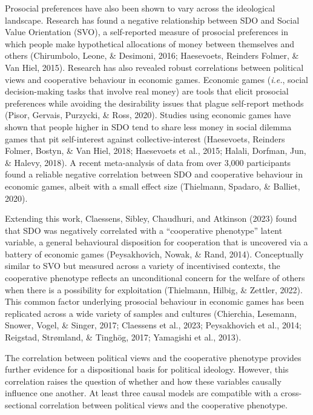 \documentclass[
  man,floatsintext]{apa6}
\begin{document}
Prosocial preferences have also been shown to vary across the ideological
landscape. Research has found a negative relationship between SDO and
Social Value Orientation (SVO), a self-reported measure of prosocial preferences
in which people make hypothetical allocations of money between themselves and
others (Chirumbolo, Leone, \& Desimoni, 2016; Haesevoets, Reinders Folmer, \& Van Hiel, 2015). Research has also revealed robust
correlations between political views and cooperative behaviour in economic
games. Economic games (\emph{i.e.}, social decision-making tasks that involve real
money) are tools that elicit prosocial preferences while avoiding the
desirability issues that plague self-report methods (Pisor, Gervais, Purzycki, \& Ross, 2020). Studies using
economic games have shown that people higher in SDO tend to share less money in
social dilemma games that pit self-interest against collective-interest
(Haesevoets, Reinders Folmer, Bostyn, \& Van Hiel, 2018; Haesevoets et al., 2015; Halali, Dorfman, Jun, \& Halevy, 2018). A recent meta-analysis of data
from over 3,000 participants found a reliable negative correlation between SDO
and cooperative behaviour in economic games, albeit with a small effect size
(Thielmann, Spadaro, \& Balliet, 2020).

Extending this work, Claessens, Sibley, Chaudhuri, and Atkinson (2023) found that SDO was negatively correlated
with a ``cooperative phenotype'' latent variable, a general behavioural
disposition for cooperation that is uncovered via a battery of economic games
(Peysakhovich, Nowak, \& Rand, 2014). Conceptually similar to SVO but measured across a variety
of incentivised contexts, the cooperative phenotype reflects an unconditional
concern for the welfare of others when there is a possibility for exploitation
(Thielmann, Hilbig, \& Zettler, 2022). This common factor underlying prosocial behaviour in economic
games has been replicated across a wide variety of samples and cultures
(Chierchia, Lesemann, Snower, Vogel, \& Singer, 2017; Claessens et al., 2023; Peysakhovich et al., 2014; Reigstad, Strømland, \& Tinghög, 2017; Yamagishi et al., 2013).

The correlation between political views and the cooperative phenotype provides
further evidence for a dispositional basis for political ideology. However, this
correlation raises the question of whether and how these variables causally
influence one another. At least three causal models are compatible with a
cross-sectional correlation between political views and the cooperative
phenotype.
\end{document}
